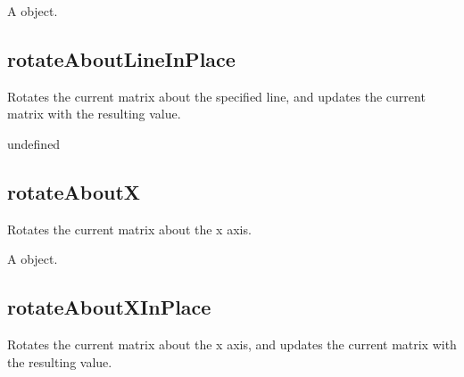 \documentclass[letterpaper,12pt,english,openany,oneside]{sphinxmanual}
\begin{document}
\label{\detokenize{JS_3D_API:section-49}}\label{\detokenize{JS_3D_API:returns-44}}

A  object.


\subsection{rotateAboutLineInPlace}
\label{\detokenize{JS_3D_API:rotateaboutlineinplace}}
Rotates the current matrix about the specified line, and updates the current matrix with the resulting value.

\label{\detokenize{JS_3D_API:syntax-44}}

\begin{sphinxVerbatim}[commandchars=\\\{\}]
  
\end{sphinxVerbatim}
\label{\detokenize{JS_3D_API:parameters-31}}

\label{\detokenize{JS_3D_API:section-50}}\label{\detokenize{JS_3D_API:returns-45}}

undefined


\subsection{rotateAboutX}
\label{\detokenize{JS_3D_API:rotateaboutx}}
Rotates the current matrix about the x axis.

\label{\detokenize{JS_3D_API:syntax-45}}

\begin{sphinxVerbatim}[commandchars=\\\{\}]
\end{sphinxVerbatim}
\label{\detokenize{JS_3D_API:parameters-32}}

\label{\detokenize{JS_3D_API:section-51}}\label{\detokenize{JS_3D_API:returns-46}}

A  object.


\subsection{rotateAboutXInPlace}
\label{\detokenize{JS_3D_API:rotateaboutxinplace}}
Rotates the current matrix about the x axis, and updates the current matrix with the resulting value.
\end{document}
